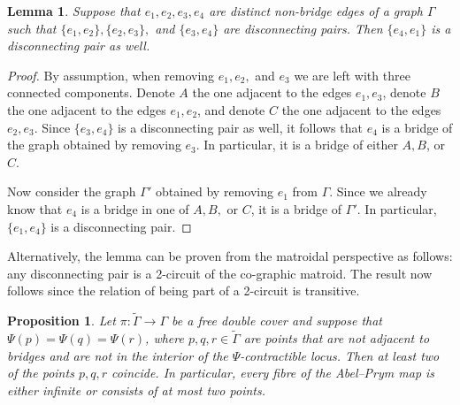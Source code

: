 \documentclass[11pt]{article}
\newtheorem{lemma}[theo]{Lemma}
\newtheorem{prop}[theo]{Proposition}
\theoremstyle{definition}
\numberwithin{equation}{section}
\theoremstyle{definition}
\newcommand{\wt}[1]{\widetilde{#1}}
\begin{document}
\begin{lemma}\label{lem:disconnectingPairs}
    Suppose that $e_1,e_2,e_3,e_4$ are distinct non-bridge edges of a graph $\Gamma$ such that
    $\{e_1,e_2\}, \{e_2,e_3\},$ and $\{e_3,e_4\}$ are disconnecting pairs. Then $\{e_4,e_1\}$ is a disconnecting pair as well. 
\end{lemma}

\begin{proof}
By assumption, when removing $e_1,e_2,$ and $e_3$ we are left with three connected components. Denote $A$ the one adjacent to the edges $e_1,e_3$, denote $B$ the one adjacent to the edges $e_1,e_2$, and denote     $C$ the one adjacent to the edges $e_2,e_3$. 
Since $\{e_3,e_4\}$ is a disconnecting pair as well, it follows that $e_4$ is a bridge of the graph obtained by removing $e_3$. In particular, it is a bridge of either $A,B$, or $C$. 

Now consider the graph $\Gamma'$ obtained by removing $e_1$ from $\Gamma$. Since we already know that $e_4$ is a bridge in one of $A,B,$ or $C$, it is a bridge of $\Gamma'$. In particular, $\{e_1,e_4\}$ is a disconnecting pair. 
\end{proof}

Alternatively, the lemma can be proven from the matroidal perspective as follows: any disconnecting pair is a 2-circuit of the co-graphic matroid. The result now follows since the relation of being part of a 2-circuit is transitive. 

\begin{prop}
    \label{prop:fibreSize}
    Let $\pi:\wt\Gamma\to\Gamma$ be a free double cover and suppose that $\Psi(p) = \Psi(q) = \Psi(r)$, where $p,q,r\in\wt\Gamma$ are points that are not adjacent to bridges and are not in the interior of the $\Psi$-contractible locus. 
     Then at least two of the points $p,q,r$ coincide. In particular, every fibre of the Abel--Prym map is either infinite or consists of at most two points. 
\end{prop}
\end{document}
